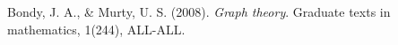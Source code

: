 {}

\begin{thebibliography}{999}

	Bondy, J. A., \& Murty, U. S. (2008). {\em Graph theory}. Graduate texts in mathematics, 1(244), ALL-ALL.

\end{thebibliography}
